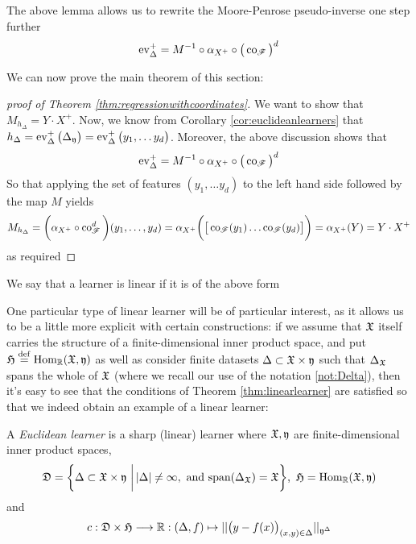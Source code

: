 The above lemma allows us to rewrite the Moore-Penrose pseudo-inverse one step further
\[
\ev_\Delta^+ = M_{}^{-1} \circ \alpha_{X^+} \circ \big( \co_{\r{F}}\big)^d
\]

We can now prove the main theorem of this section:

\begin{proof}[proof of Theorem \ref{thm:regressionwithcoordinates}]
	We want to show that $M_{h_\Delta} = Y\cdot X^+$. Now, we know from Corollary \ref{cor:euclideanlearners} that $h_\Delta = \operatorname{ev}_\Delta^+\big(\Delta_{\mathfrak{y}}\big) =\operatorname{ev}_\Delta^+\big(y_1,\ldots y_d\big)$. Moreover, the above discussion shows that 
\[
\ev_\Delta^+ = M^{-1} \circ \alpha_{X^+} \circ \big(\co_{\r{F}}\big)^d
\]
So that applying the set of features $(y_1,\ldots y_d)$ to the left hand side followed by the map $M$ yields
\[
M_{h_\Delta}=\bigg(\alpha_{X^+} \circ \co^d_\r{F}\bigg)(y_1,\ldots , y_d)=\alpha_{X^+}\bigg( \big[\co_{\r{F}}(y_1)\ldots \co_{\r{F}}(y_d)\big]\bigg)=\alpha_{X^+}(Y) = Y\cdot X^+
\]
as required
\end{proof}



\begin{definition}
We say that a learner is linear if it is of the above form
\end{definition}

One particular type of linear learner will be of particular interest, as it allows us to be a little more explicit with certain constructions: if we assume that $\mathfrak{X}$ itself carries the structure of a finite-dimensional inner product space, and put $\mathfrak{H}\stackrel{\operatorname{def}}{=} \operatorname{Hom}_{\mathbb{R}}(\mathfrak{X},\mathfrak{y})$ as well as consider finite datasets $\Delta \subset \mathfrak{X}\times \mathfrak{y}$ such that $\Delta_{\mathfrak{X}}$ spans the whole of $\mathfrak{X}$
(where we recall our use of the notation \ref{not:Delta}), then it's easy to see that the conditions of Theorem \ref{thm:linearlearner} are satisfied so that we indeed obtain an example of a linear learner:


\begin{definition}\label{def:euclideanlearner}
A \emph{Euclidean learner} is a sharp (linear) learner where $\mathfrak{X},\mathfrak{y}$ are finite-dimensional inner product spaces, \[
\mathfrak{D} = \bigg\{ \Delta \subset \mathfrak{X}\times \mathfrak{y}\,\,\bigg\vert\,  \vert \Delta \vert \neq \infty , \textrm{ and span}(\Delta_{\mathfrak{X}}) = \mathfrak{X}\bigg\}
\text{,}\,\,\, \mathfrak{H}=\operatorname{Hom}_{\mathbb{R}}(\mathfrak{X},\mathfrak{y})
\]
and 
\[
c:\mathfrak{D}\times \mathfrak{H}\longrightarrow \mathbb{R}:(\Delta,f)\mapsto \vert \vert \big( y-f(x)\big)_{(x,y)\in \Delta} \vert \vert_{\mathfrak{y}^\Delta} 
\]
\end{definition}

